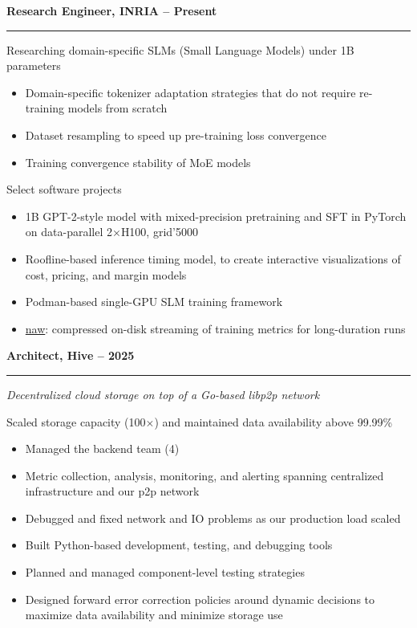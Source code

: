 \documentclass[a4paper,11pt]{article}
\newcommand{\styleRub}[1]{\needspace{6\baselineskip}\noindent\textbf{\large #1}\par\nopagebreak}
\newcommand{\job}[2]{#1\hfill{\normalsize\mdseries #2}}
\newcommand{\company}[1]{\textit{#1}\par\medskip}
\newenvironment{sectionblock}[1]
{\styleRub{#1}\vspace{-0.6\baselineskip}\noindent\rule{\textwidth}{0.5mm}\par\nopagebreak
\begin{list}{}{\setlength{\leftmargin}{10pt}\setlength{\topsep}{0pt}}\item\relax}
{\end{list}}
\begin{document}
\vspace{0.45cm}
\begin{sectionblock}{\job{Research Engineer, INRIA}{2025 -- Present}}

Researching domain-specific SLMs (Small Language Models) under 1B parameters

\begin{itemize}
\item Domain-specific tokenizer adaptation strategies that do
not require re-training models from scratch
\item Dataset resampling to speed up pre-training loss convergence
\item Training convergence stability of MoE models
\end{itemize}

Select software projects
\begin{itemize}
\item 1B GPT-2-style model with mixed-precision pretraining and SFT in PyTorch on data-parallel 2$\times$H100, grid'5000
\item Roofline-based inference timing model, to create interactive
        visualizations of cost, pricing, and margin models
\item Podman-based single-GPU SLM training framework
\item \href{https://mlacage.gitlabpages.inria.fr/naw/latest/}{naw}: compressed on-disk streaming of training metrics for long-duration runs
\end{itemize}

\end{sectionblock}

\vspace{0.45cm}
\begin{sectionblock}{\job{Architect, Hive}{2023 -- 2025}}
\company{Decentralized cloud storage on top of a Go-based libp2p network}

Scaled storage capacity (100$\times$) and maintained data availability above 99.99\%

\begin{itemize}
\item Managed the backend team (4)
\item Metric collection, analysis, monitoring, and alerting
        spanning centralized infrastructure and our p2p network
\item Debugged and fixed network and IO problems as our production load scaled
\item Built Python-based development, testing, and debugging tools
\item Planned and managed component-level testing strategies
\item Designed forward error correction policies around dynamic
        decisions to maximize data availability and minimize storage use
\end{itemize}

\end{sectionblock}
\end{document}
